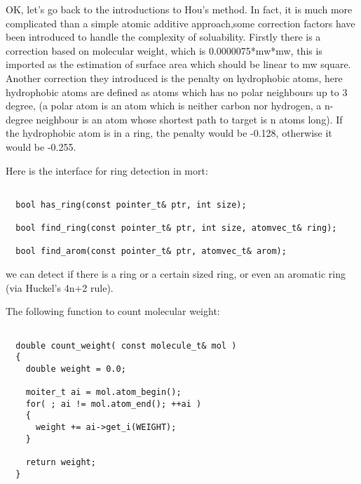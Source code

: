 \documentclass[letterpaper]{book}
\begin{document}
OK, let's go back to the introductions to Hou's method. In fact, it is much more complicated 
than a simple atomic additive approach,some correction factors have been introduced to handle 
the complexity of soluability. Firstly there is a correction based on molecular weight, which 
is 0.0000075*mw*mw, this is imported as the estimation of surface area which should be linear 
to mw square. Another correction they introduced is the penalty on hydrophobic atoms, here 
hydrophobic atoms are defined as atoms which has no polar neighbours up to 3 degree, (a polar 
atom is an atom which is neither carbon nor hydrogen, a n-degree neighbour is an atom whose 
shortest path to target is n atoms long). If the hydrophobic atom is in a ring, the penalty 
would be -0.128, otherwise it would be -0.255.

Here is the interface for ring detection in mort:

\begin{lstlisting}

  bool has_ring(const pointer_t& ptr, int size);

  bool find_ring(const pointer_t& ptr, int size, atomvec_t& ring);
    
  bool find_arom(const pointer_t& ptr, atomvec_t& arom);

\end{lstlisting}

we can detect if there is a ring or a certain sized ring, or even an aromatic ring (via Huckel's
4n+2 rule).

The following function to count molecular weight:

\begin{lstlisting}

  double count_weight( const molecule_t& mol )
  {
    double weight = 0.0;
	
    moiter_t ai = mol.atom_begin();
    for( ; ai != mol.atom_end(); ++ai )
    {
      weight += ai->get_i(WEIGHT);
    }

    return weight;
  }

\end{lstlisting}

\end{document}
